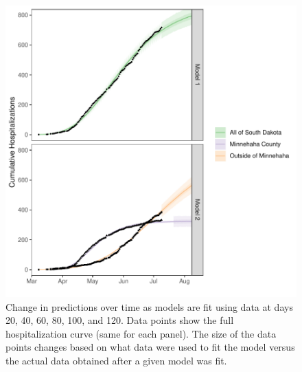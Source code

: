 \documentclass[
]{article}
\begin{document}
\begin{figure}
\centering
\includegraphics{manuscript_files/figure-latex/unnamed-chunk-3-1.pdf}
\caption{\label{fig:unnamed-chunk-3}Change in predictions over time as models are fit using data at days 20, 40, 60, 80, 100, and 120. Data points show the full hospitalization curve (same for each panel). The size of the data points changes based on what data were used to fit the model versus the actual data obtained after a given model was fit.\label{pred_overtime:plot}}
\end{figure}
\end{document}
